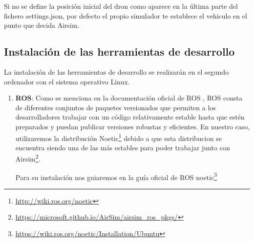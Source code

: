Si no se define la posición inicial del dron como aparece en la última parte del fichero settings.json, por defecto el propio simulador te establece el vehiculo en el punto que decida Airsim. 



  \subsection{Instalación de las herramientas de desarrollo}
  \label{subsec:Instalación de las herramientas de desarrollo}
  La instalación de las herramientas de desarrollo se realizarán en el segundo ordenador con el sistema operativo Linux.
  \begin{enumerate}
    \item \textbf{ROS}: Como se menciona en la documentación oficial de ROS \cite{Dis_ROS}, ROS consta de diferentes conjuntos de paquetes versionados que permiten a los desarrolladores
    trabajar con un código relativamente estable hasta que estén preparados y puedan publicar versiones robustas y eficientes. En nuestro caso, utilizaremos la distribución Noetic\footnote{\url{http://wiki.ros.org/noetic}}
    debido a que esta distribucion se encuentra siendo una de las más estables para poder trabajar junto con Airsim\footnote{\url{https://microsoft.github.io/AirSim/airsim_ros_pkgs/}}.

    Para su instalación nos guiaremos en la guía oficial de ROS noetic\footnote{\url{https://wiki.ros.org/noetic/Installation/Ubuntu}}


\end{enumerate}
